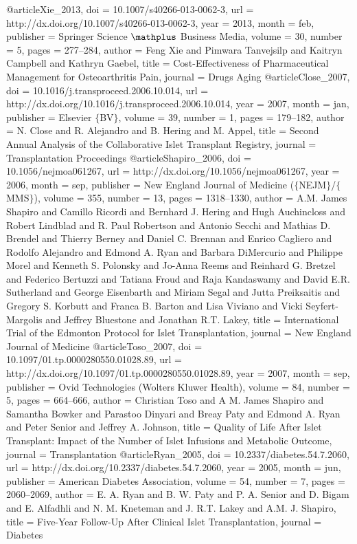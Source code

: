 @article{Xie_2013,
	doi = {10.1007/s40266-013-0062-3},
	url = {http://dx.doi.org/10.1007/s40266-013-0062-3},
	year = 2013,
	month = {feb},
	publisher = {Springer Science $\mathplus$ Business Media},
	volume = {30},
	number = {5},
	pages = {277--284},
	author = {Feng Xie and Pimwara Tanvejsilp and Kaitryn Campbell and Kathryn Gaebel},
	title = {Cost-Effectiveness of Pharmaceutical Management for Osteoarthritis Pain},
	journal = {Drugs Aging}
}
@article{Close_2007,
	doi = {10.1016/j.transproceed.2006.10.014},
	url = {http://dx.doi.org/10.1016/j.transproceed.2006.10.014},
	year = 2007,
	month = {jan},
	publisher = {Elsevier $\lbrace$BV$\rbrace$},
	volume = {39},
	number = {1},
	pages = {179--182},
	author = {N. Close and R. Alejandro and B. Hering and M. Appel},
	title = {Second Annual Analysis of the Collaborative Islet Transplant Registry},
	journal = {Transplantation Proceedings}
}
@article{Shapiro_2006,
	doi = {10.1056/nejmoa061267},
	url = {http://dx.doi.org/10.1056/nejmoa061267},
	year = 2006,
	month = {sep},
	publisher = {New England Journal of Medicine ($\lbrace$NEJM$\rbrace$/$\lbrace$MMS$\rbrace$)},
	volume = {355},
	number = {13},
	pages = {1318--1330},
	author = {A.M. James Shapiro and Camillo Ricordi and Bernhard J. Hering and Hugh Auchincloss and Robert Lindblad and R. Paul Robertson and Antonio Secchi and Mathias D. Brendel and Thierry Berney and Daniel C. Brennan and Enrico Cagliero and Rodolfo Alejandro and Edmond A. Ryan and Barbara DiMercurio and Philippe Morel and Kenneth S. Polonsky and Jo-Anna Reems and Reinhard G. Bretzel and Federico Bertuzzi and Tatiana Froud and Raja Kandaswamy and David E.R. Sutherland and George Eisenbarth and Miriam Segal and Jutta Preiksaitis and Gregory S. Korbutt and Franca B. Barton and Lisa Viviano and Vicki Seyfert-Margolis and Jeffrey Bluestone and Jonathan R.T. Lakey},
	title = {International Trial of the Edmonton Protocol for Islet Transplantation},
	journal = {New England Journal of Medicine}
}
@article{Toso_2007,
	doi = {10.1097/01.tp.0000280550.01028.89},
	url = {http://dx.doi.org/10.1097/01.tp.0000280550.01028.89},
	year = 2007,
	month = {sep},
	publisher = {Ovid Technologies (Wolters Kluwer Health)},
	volume = {84},
	number = {5},
	pages = {664--666},
	author = {Christian Toso and A M. James Shapiro and Samantha Bowker and Parastoo Dinyari and Breay Paty and Edmond A. Ryan and Peter Senior and Jeffrey A. Johnson},
	title = {Quality of Life After Islet Transplant: Impact of the Number of Islet Infusions and Metabolic Outcome},
	journal = {Transplantation}
}
@article{Ryan_2005,
	doi = {10.2337/diabetes.54.7.2060},
	url = {http://dx.doi.org/10.2337/diabetes.54.7.2060},
	year = 2005,
	month = {jun},
	publisher = {American Diabetes Association},
	volume = {54},
	number = {7},
	pages = {2060--2069},
	author = {E. A. Ryan and B. W. Paty and P. A. Senior and D. Bigam and E. Alfadhli and N. M. Kneteman and J. R.T. Lakey and A.M. J. Shapiro},
	title = {Five-Year Follow-Up After Clinical Islet Transplantation},
	journal = {Diabetes}
}
